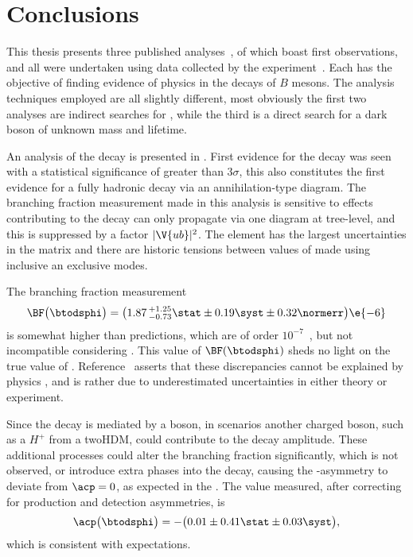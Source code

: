 \chapter{Conclusions}
\label{ch:conc}

This thesis presents three published
analyses~\cite{LHCb-PAPER-2012-025,LHCb-PAPER-2014-030,LHCb-PAPER-2015-036},
of which boast first observations, and all were
undertaken using data collected by the \lhcb experiment~\cite{Alves:2008zz}.
Each has the objective of finding evidence of physics \bsm in the decays of $B$ mesons.
The analysis techniques employed are all slightly different, most obviously the first two analyses
are indirect searches for \np, while the third is a direct search for a dark boson of unknown mass
and lifetime.

An analysis of the decay \btodsphi is presented in .
First evidence for the decay was seen with a statistical significance of greater than $3\sigma$,
this also constitutes the first evidence for a fully hadronic decay via an annihilation-type
diagram.
The branching fraction measurement made in this analysis is sensitive to \np effects contributing
to the decay \btodsphi can only propagate via one diagram at tree-level, and this is suppressed by
a factor $|\V{ub}|^2$.
The element  has the largest uncertainties in the \ckm matrix and there are historic tensions
between values of  made using inclusive an exclusive modes.

The branching fraction measurement
\begin{equation*}
  \BF\big(\btodsphi\big) =
  \big(1.87\,^{+1.25}_{-0.73}\stat\pm0.19\syst\pm0.32\normerr\big)\e{-6}
\end{equation*}
is somewhat higher than \sm predictions, which are
of order $10^{-7}$~\cite{Zou:2009zza,Mohanta:2002wf,PhysRevD.76.057701,Lu:2001yz}, but
not incompatible considering .
This value of $\BF(\btodsphi)$ sheds no light on the true value of .
Reference~\cite{Crivellin:2014zpa} asserts that these
discrepancies cannot be explained by physics \bsm, and is rather due to underestimated
uncertainties in either theory or experiment.

Since the decay \btodsphi is mediated by a \Wp boson, in \np scenarios another charged boson, such
as a $H^+$ from a \gls{twoHDM}, could contribute to the decay amplitude.
These additional processes could alter the branching fraction significantly, which is not observed,
or introduce extra phases into the decay, causing the \CP-asymmetry to deviate from $\acp=0$, as
expected in the \sm.
The value measured, after correcting for production and detection asymmetries, is
\begin{equation*}
  \acp\big(\btodsphi\big)=
  -\big(0.01\pm0.41\stat\pm0.03\syst\big),
\end{equation*}
which is consistent with \sm expectations.


